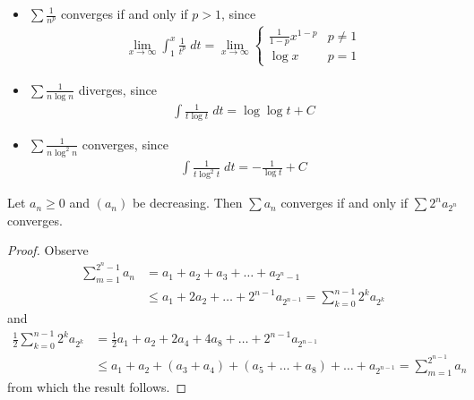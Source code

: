 \documentclass{../../template/note}
\begin{document}
    \begin{example}
        \begin{itemize}
            \item \(\sum \frac 1 {n^p}\) converges if and only if \(p > 1\), since
            \begin{align*}
                \lim_{x \to \infty}\int_1^x \frac{1}{t^p} \; dt = \lim_{x \to \infty} \begin{cases}
                    \frac{1}{1-p}x^{1-p} & p \neq 1 \\
                    \log x & p = 1
                \end{cases}
            \end{align*}
            \item \(\sum \frac 1 {n \log n}\) diverges, since
            \begin{align*}
                \int \frac 1 {t \log t} \; dt = \log \log t + C
            \end{align*}
            \item \(\sum \frac 1 {n \log^2 n}\) converges, since
            \begin{align*}
                \int \frac 1 {t \log^2 t} \; dt = -\frac 1 {\log t} + C
            \end{align*}
        \end{itemize}
    \end{example}
    
    \begin{proposition}
        Let \(a_n \geq 0\) and \((a_n)\) be decreasing. Then \(\sum a_n\) converges if and only if \(\sum 2^n a_{2^n}\) converges.
    \end{proposition}
    
    \begin{proof}
        Observe
        \begin{align*}
            \sum_{m=1}^{2^n-1} a_n &= a_1 + a_2 + a_3 + \dots + a_{2^n-1} \\
            &\leq a_1 + 2a_2 + \dots + 2^{n-1}a_{2^{n-1}} = \sum_{k=0}^{n-1} 2^k a_{2^k}
        \end{align*}
        and
        \begin{align*}
            \frac{1}{2}\sum_{k=0}^{n-1} 2^k a_{2^k} &= \frac 1 2 a_1 + a_2 + 2a_4 + 4a_8 + \dots + 2^{n-1}a_{2^{n-1}} \\
            &\leq a_1 + a_2 + (a_3 + a_4) + (a_5 + \dots + a_8) + \dots + a_{2^{n-1}} = \sum_{m=1}^{2^{n-1}} a_n
        \end{align*}
        from which the result follows.   
    \end{proof}
    
\end{document}

